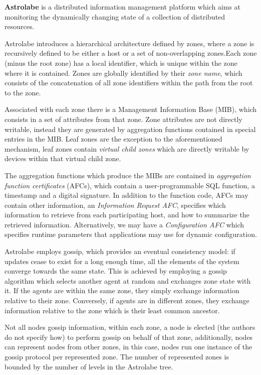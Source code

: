 \textbf{Astrolabe} \cite{Renesse2003} is a distributed information management platform which aims at monitoring the dynamically changing state of a collection of distributed resources. 

Astrolabe introduces a hierarchical architecture defined by zones, where a zone is recursively defined to be either a host or a set of non-overlapping zones.Each zone (minus the root zone) has a local identifier, which is unique within the zone where it is contained. Zones are globally identified by their \textit{zone name}, which consists of the concatenation of all zone identifiers within the path from the root to the zone.

Associated with each zone there is a Management Information Base (MIB), which consists in a set of attributes from that zone. Zone attributes are not directly writable, instead they are generated by aggregation functions contained in special entries in the MIB. Leaf zones are the exception to the aforementioned mechanism, leaf zones contain \textit{virtual child zones} which are directly writable by devices within that virtual child zone.

The aggregation functions which produce the MIBs are contained in \textit{aggregation function certificates} (AFCs), which contain a user-programmable SQL function, a timestamp and a digital signature. In addition to the function code, AFCs may contain other information, an \textit{Information Request AFC},  specifies which information to retrieve from each participating host, and how to summarize the retrieved information. Alternatively, we may have a \textit{Configuration AFC} which specifies runtime parameters that applications may use for dynamic configuration.

Astrolabe employs gossip, which provides an eventual consistency model: if updates cease to exist for a long enough time, all the elements of the system  converge towards the same state. This is achieved by employing a gossip algorithm which selects another agent at random and exchanges zone state with it. If the agents are within the same zone, they simply exchange information relative to their zone. Conversely, if agents are in different zones, they exchange information relative to the zone which is their least common ancestor.

Not all nodes gossip information, within each zone, a node is elected (the authors do not specify how) to perform gossip on behalf of that zone, additionally, nodes can represent nodes from other zones, in this case, nodes run one instance of the gossip protocol per represented zone. The number of represented zones is bounded by the number of levels in the Astrolabe tree.

